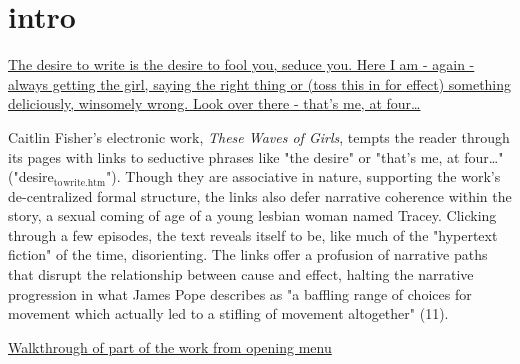 \documentclass[11pt]{article}
\author{Filipa  Calado}
\date{\today}
\title{}
\begin{document}
\tableofcontents

\section{intro}
\label{sec:orgc160c89}

\href{file:///images/desire.png}{The desire to write is the desire to fool you,
seduce you. Here I am - again - always getting the girl, saying the
right thing or (toss this in for effect) something deliciously,
winsomely wrong. Look over there - that's me, at four\ldots{}}

Caitlin Fisher's electronic work, \emph{These Waves of Girls}, tempts the
reader through its pages with links to seductive phrases like "the
desire" or "that's me, at four\ldots{}"  ("desire\(_{\text{to}}\)\(_{\text{write.htm}}\)"). Though
they are associative in nature, supporting the work's de-centralized
formal structure, the links also defer narrative coherence within the
story, a sexual coming of age of a young lesbian woman named
Tracey. Clicking through a few episodes, the text reveals itself to
be, like much of the "hypertext fiction" of the time,
disorienting. The links offer a profusion of narrative paths that
disrupt the relationship between cause and effect, halting the
narrative progression in what James Pope describes as "a baffling
range of choices for movement which actually led to a stifling of
movement altogether" (11).

\href{file:///videos/erotic.gif}{Walkthrough of part of the work from opening menu}
\end{document}
